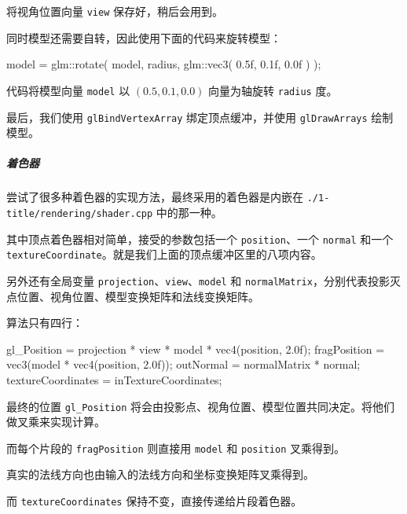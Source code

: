 \documentclass[
]{article}
\newenvironment{Shaded}{}{}
\newcommand{\BuiltInTok}[1]{#1}
\newcommand{\FloatTok}[1]{\textcolor[rgb]{0.25,0.63,0.44}{#1}}
\newcommand{\NormalTok}[1]{#1}
\begin{document}
将视角位置向量 \texttt{view} 保存好，稍后会用到。

同时模型还需要自转，因此使用下面的代码来旋转模型：

\begin{Shaded}
\begin{Highlighting}[]
\NormalTok{model = glm::rotate( model, radius, glm::vec3( }\FloatTok{0.5}\BuiltInTok{f}\NormalTok{, }\FloatTok{0.1}\BuiltInTok{f}\NormalTok{, }\FloatTok{0.0}\BuiltInTok{f}\NormalTok{ ) );}
\end{Highlighting}
\end{Shaded}

代码将模型向量 \texttt{model} 以 \((0.5, 0.1, 0.0)\) 向量为轴旋转
\texttt{radius} 度。

最后，我们使用 \texttt{glBindVertexArray} 绑定顶点缓冲，并使用
\texttt{glDrawArrays} 绘制模型。

\hypertarget{header-n135}{%
\subparagraph{着色器}\label{header-n135}}

尝试了很多种着色器的实现方法，最终采用的着色器是内嵌在
\texttt{./1-title/rendering/shader.cpp} 中的那一种。

其中顶点着色器相对简单，接受的参数包括一个 \texttt{position}、一个
\texttt{normal} 和一个
\texttt{textureCoordinate}。就是我们上面的顶点缓冲区里的八项内容。

另外还有全局变量 \texttt{projection}、\texttt{view}、\texttt{model} 和
\texttt{normalMatrix}，分别代表投影灭点位置、视角位置、模型变换矩阵和法线变换矩阵。

算法只有四行：

\begin{Shaded}
\begin{Highlighting}[]
\NormalTok{gl_Position = projection * view * model * vec4(position, }\FloatTok{2.0}\BuiltInTok{f}\NormalTok{);}
\NormalTok{fragPosition = vec3(model * vec4(position, }\FloatTok{2.0}\BuiltInTok{f}\NormalTok{));}
\NormalTok{outNormal = normalMatrix * normal;}
\NormalTok{textureCoordinates = inTextureCoordinates;}
\end{Highlighting}
\end{Shaded}

最终的位置 \texttt{gl\_Position}
将会由投影点、视角位置、模型位置共同决定。将他们做叉乘来实现计算。

而每个片段的 \texttt{fragPosition} 则直接用 \texttt{model} 和
\texttt{position} 叉乘得到。

真实的法线方向也由输入的法线方向和坐标变换矩阵叉乘得到。

而 \texttt{textureCoordinates} 保持不变，直接传递给片段着色器。
\end{document}
